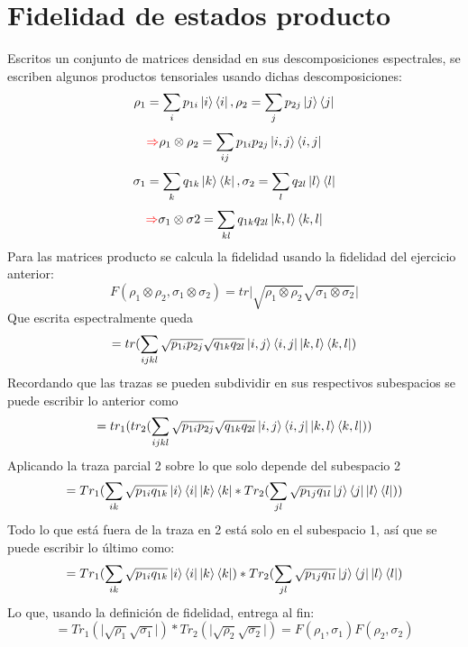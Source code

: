 \documentclass{book}
\begin{document}
\section{{Fidelidad de estados producto}}
Escritos un conjunto de matrices densidad en sus descomposiciones espectrales, se escriben algunos productos tensoriales usando dichas descomposiciones:
\begin{equation}{\rho_1=\sum_i p_{1i}\ket{i}\bra{i}, \rho_2=\sum_j p_{2j}\ket{j}\bra{j}}\end{equation}
\begin{equation}{\textcolor{red}{\Rightarrow}\rho_1\otimes\rho_2=\sum_{ij}p_{1i}p_{2j}\ket{i,j}\bra{i,j}}\end{equation}
\begin{equation}{\sigma_1=\sum_k q_{1k}\ket{k}\bra{k}, \sigma_2=\sum_l q_{2l}\ket{l}\bra{l}}\end{equation}
\begin{equation}{\textcolor{red}{\Rightarrow}\sigma_1\otimes\sigma2=\sum_{kl}q_{1k}q_{2l}\ket{k,l}\bra{k,l}}\end{equation}
Para las matrices producto se calcula la fidelidad usando la fidelidad del ejercicio anterior:
\begin{equation}{F(\rho_1\otimes\rho_2,\sigma_1\otimes\sigma_2)=tr\lvert\sqrt{\rho_1\otimes\rho_2}\sqrt{\sigma_1\otimes\sigma_2}}\rvert\end{equation}
Que escrita espectralmente queda
\begin{equation}{=tr(\sum_{ijkl}\sqrt{p_{1i}p_{2j}}\sqrt{q_{1k}q_{2l}}\ket{i,j}\bra{i,j}\ket{k,l}\bra{k,l})}\end{equation}
Recordando que las trazas se pueden subdividir en sus respectivos subespacios se puede escribir lo anterior como
\begin{equation}{=tr_1(tr_2(\sum_{ijkl}\sqrt{p_{1i}p_{2j}}\sqrt{q_{1k}q_{2l}}\ket{i,j}\bra{i,j}\ket{k,l}\bra{k,l}))}\end{equation}
Aplicando la traza parcial 2 sobre lo que solo depende del subespacio 2
\begin{equation}{=Tr_1(\sum_{ik}\sqrt{p_{1i}q_{1k}}\ket{i}\bra{i}\ket{k}\bra{k}*Tr_2(\sum_{jl}\sqrt{p_{1j}q_{1l}}\ket{j}\bra{j}\ket{l}\bra{l}))}\end{equation}
Todo lo que está fuera de la traza en 2 está solo en el subespacio 1, así que se puede escribir lo último como:
\begin{equation}{=Tr_1(\sum_{ik}\sqrt{p_{1i}q_{1k}}\ket{i}\bra{i}\ket{k}\bra{k})*Tr_2(\sum_{jl}\sqrt{p_{1j}q_{1l}}\ket{j}\bra{j}\ket{l}\bra{l})}\end{equation}
Lo que, usando la definición de fidelidad, entrega al fin:
\begin{equation}{=Tr_1(\lvert\sqrt{\rho_1}\sqrt{\sigma_1}\rvert)*Tr_2(\lvert\sqrt{\rho_2}\sqrt{\sigma_2}\rvert)=F(\rho_1,\sigma_1)F(\rho_2,\sigma_2)}\end{equation}
\end{document}
